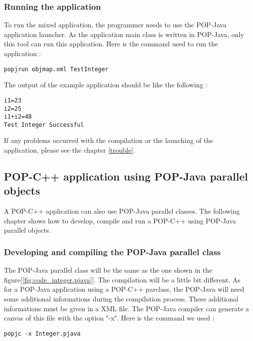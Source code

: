 \subsubsection{Running the application}
To run the mixed application, the programmer needs to use the POP-Java application launcher. As the application main class is written in POP-Java, only this tool can run this application. Here is the command used to run the application : 
\begin{lstlisting}
popjrun objmap.xml TestInteger
\end{lstlisting}\s

The output of the example application should be like the following : 
\begin{lstlisting}
i1=23
i2=25
i1+i2=48
Test Integer Successful 
\end{lstlisting}\s

If any problems occurred with the compilation or the launching of the application, please see the chapter \ref{trouble}.


\pagebreak
\subsection{POP-C++ application using POP-Java parallel objects}
A POP-C++ application can also use POP-Java parallel classes. The following chapter shows how to develop, compile and run a POP-C++ using POP-Java parallel objects.

\subsubsection{Developing and compiling the POP-Java parallel class}
The POP-Java parallel class will be the same as the one shown in the figure[\ref{fig:code_integer.pjava}]. The compilation will be a little bit different. As for a POP-Java application using a POP-C++ parclass, the POP-Java will need some additional informations during the compilation process. These additional informations must be given in a XML file. The POP-Java compiler can generate a canvas of this file with the option "-x". Here is the command we used : 

\begin{lstlisting}
popjc -x Integer.pjava
\end{lstlisting}\s

